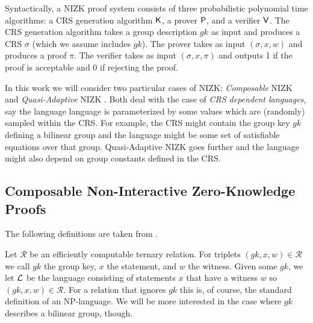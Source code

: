Syntactically, a NIZK proof system consists of three probabilistic polynomial time algorithms: a CRS
generation algorithm $\mathsf{K}$, a prover $\mathsf{P}$, and a verifier $\mathsf{V}$.
The CRS generation algorithm takes a group description $gk$ as input and produces a CRS $\sigma$ (which we assume includes $gk$). The prover takes as input $(\sigma, x, w)$ and produces a proof $\pi$. The verifier takes as input $(\sigma, x, \pi)$ and outputs 1 if the proof is acceptable and 0 if rejecting the proof.

In this work we will consider two particular cases of NIZK: \emph{Composable} NIZK \cite{EC:GroSah08} and  \emph{Quasi-Adaptive} NIZK \cite{AC:JutRoy13}. Both deal with the case of \emph{CRS dependent languages}, say the language language is parameterized by some values which are (randomly) sampled within the CRS. For example, the CRS might contain the group key $gk$ defining a bilinear group and the language might be some set of satisfiable equations over that group. Quasi-Adaptive NIZK goes further and the language might also depend on group constants defined in the CRS.
 
\subsection{Composable Non-Interactive Zero-Knowledge Proofs}
The following definitions are taken from \cite{SIAMJC:GroSah12}.

\begin{definition} Let $\mathcal{R}$ be an efficiently computable ternary relation.
For triplets $(gk, x, w)\in \mathcal{R}$ we call $gk$ the group key, $x$ the statement, and $w$ the witness.
Given some $gk$, we let $\mathcal{L}$ be the language consisting of statements $x$ that have a
witness $w$ so $(gk, x, w) \in \mathcal{R}$. For a relation that ignores $gk$ this is, of course, the
standard definition of an NP-language. We will be more interested in the case where
$gk$ describes a bilinear group, though.
\end{definition}

